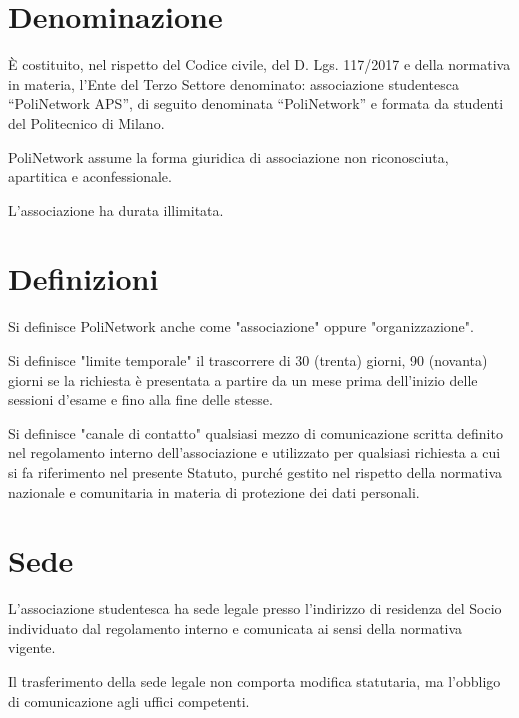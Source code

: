\documentclass[legalpaper, 11pt]{exam}
\let\tempone\enumerate
\let\temptwo\endenumerate
\renewenvironment{enumerate}{\tempone\addtolength{\itemsep}{-0.45\baselineskip}}{\temptwo}
\begin{document}
{

\begin{center}

\end{center}


\section{Denominazione}
\begin{enumerate}
 \item È costituito, nel rispetto del Codice civile, del D. Lgs. 117/2017 e della normativa in materia, l’Ente del Terzo Settore denominato: associazione studentesca “PoliNetwork APS”, di seguito denominata “PoliNetwork” e formata da studenti del Politecnico di Milano.
 \item PoliNetwork assume la forma giuridica di associazione non riconosciuta, apartitica e aconfessionale.
 \item L'associazione ha durata illimitata.
\end{enumerate}

\section{Definizioni}
\begin{enumerate}
 \item Si definisce PoliNetwork anche come "associazione" oppure "organizzazione".
 \item Si definisce "limite temporale" il trascorrere di 30 (trenta) giorni, 90 (novanta) giorni se la richiesta è presentata a partire da un mese prima dell'inizio delle sessioni d'esame e fino alla fine delle stesse.
 \item Si definisce "canale di contatto" qualsiasi mezzo di comunicazione scritta definito nel regolamento interno dell'associazione e utilizzato per qualsiasi richiesta a cui si fa riferimento nel presente Statuto, purché gestito nel rispetto della normativa nazionale e comunitaria in materia di protezione dei dati personali.
\end{enumerate}

\section{Sede}
\begin{enumerate}
 \item L’associazione studentesca ha sede legale presso l’indirizzo di residenza del Socio individuato dal regolamento interno e comunicata ai sensi della normativa vigente.
 \item Il trasferimento della sede legale non comporta modifica statutaria, ma l’obbligo di comunicazione agli uffici competenti.
\end{enumerate}

}
\end{document}
